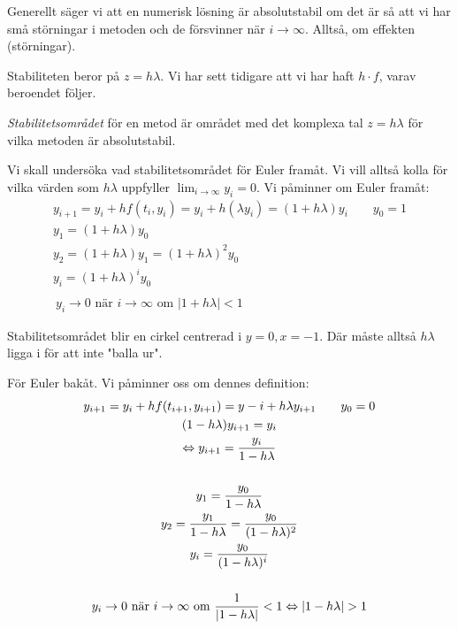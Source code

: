 \par\bigskip
\noindent Generellt säger vi att en numerisk lösning är absolutstabil om det är så att vi har små störningar i metoden och de försvinner när $i\to\infty$. Alltså, om effekten (störningar).
\par\bigskip
\noindent Stabiliteten beror på $z=h\lambda$. Vi har sett tidigare att vi har haft $h\cdot f$, varav beroendet följer.
\par\bigskip
\noindent \textit{Stabilitetsområdet } för en metod är området med det komplexa tal $z = h\lambda$ för vilka metoden är absolutstabil.
\par\bigskip
\noindent Vi skall undersöka vad stabilitetsområdet för Euler framåt. Vi vill alltså kolla för vilka värden som $h\lambda$ uppfyller $\lim_{i\to\infty}y_i=0$. Vi påminner om Euler framåt:
\begin{equation*}
  \begin{gathered}
    y_{i+1}=y_i+hf(t_i,y_i) = y_i+h(\lambda y_i)= (1+h\lambda)y_i\qquad y_0=1\\
    y_1 = (1+h\lambda)y_0\\
    y_2 = (1+h\lambda)y_1=(1+h\lambda)^2y_0\\
    y_i = (1+h\lambda)^iy_0\\\\\
    y_i\to0 \text{ när } i\to\infty \text{ om } \left|1+h\lambda\right|<1
  \end{gathered}
\end{equation*}
\par\bigskip
\noindent Stabilitetsområdet blir en cirkel centrerad i $y=0, x=-1$. Där måste alltså $h\lambda$ ligga i för att inte "balla ur".
\par\bigskip
\noindent För Euler bakåt. Vi påminner oss om dennes definition:
\begin{equation*}
  \begin{gathered}
    y_{i+1} = y_i + hf(t_{i+1},y_{i+1}) = y-i+h\lambda y_{i+1}\qquad y_0=0\\
    (1-h\lambda)y_{i+1} = y_i\\
    \Leftrightarrow y_{i+1} = \dfrac{y_i}{1-h\lambda}\\\\
    y_1 = \dfrac{y_0}{1-h\lambda}\\
    y_2 = \dfrac{y_1}{1-h\lambda} = \dfrac{y_0}{(1-h\lambda)^2}\\
    y_i = \dfrac{y_0}{(1-h\lambda)^i}\\\\
    y_i\to0 \text{ när } i\to\infty\text{ om } \dfrac{1}{\left|1-h\lambda\right|}<1 \Leftrightarrow \left|1-h\lambda\right| >1
  \end{gathered}
\end{equation*}
